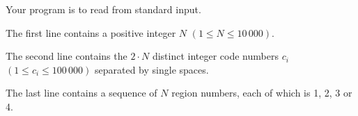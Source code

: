 Your program is to read from standard input. 

The first line contains a positive integer $N$ $(1 \le N \le 10\,000)$. 

The second line contains the $2 \cdot N$ distinct integer code numbers $c_i$ $(1 \le
c_i \le 100\,000)$ separated by single spaces. 

The last line contains a sequence of $N$ region numbers, each of which is 1, 2, 3 or 4.